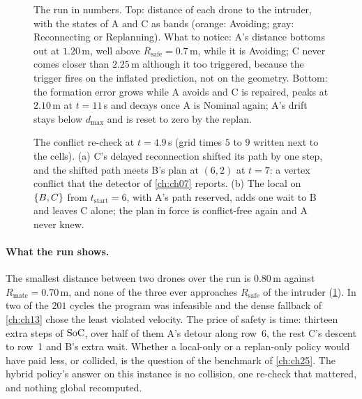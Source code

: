 \begin{figure}[tb]
  \centering
  \caption{The run in numbers. Top: distance of each drone to the intruder,
  with the states of A and C as bands (orange: Avoiding; gray: Reconnecting
  or Replanning). What to notice: A's distance bottoms out at $1.20$\,m,
  well above $R_{\mathrm{safe}} = 0.7$\,m, while it is Avoiding; C never comes
  closer than $2.25$\,m although it too triggered, because the trigger fires
  on the inflated prediction, not on the geometry. Bottom: the formation
  error grows while A avoids and C is repaired, peaks at $2.10$\,m at
  $t = 11$\,s and decays once A is Nominal again; A's drift stays below
  $d_{\max}$ and is reset to zero by the replan.}
  \label{fig:ch24-timeline}
\end{figure}

\begin{figure}[tb]
  \centering
  \caption{The conflict re-check at $t = 4.9$\,s (grid times $5$ to $9$
  written next to the cells). (a) C's delayed reconnection shifted its path
  by one step, and the shifted path meets B's plan at $(6,2)$ at $t = 7$: a
  vertex conflict that the detector of \cref{ch:ch07} reports. (b) The local
  \cbs on $\left\{ B, C \right\}$ from $t_{\mathrm{start}} = 6$, with A's path
  reserved, adds one wait to B and leaves C alone; the plan in force is
  conflict-free again and A never knew.}
  \label{fig:ch24-recheck}
\end{figure}

\paragraph{What the run shows.}
The smallest distance between two drones over the run is $0.80$\,m against
$R_{\mathrm{mate}} = 0.70$\,m, and none of the three ever approaches
$R_{\mathrm{safe}}$ of the intruder (\cref{fig:ch24-timeline}). In two of the
$201$ cycles the \orca program was infeasible and the dense fallback of
\cref{ch:ch13} chose the least violated velocity. The price of safety is
time: thirteen extra steps of $\mathrm{SoC}$, over half of them A's detour along
row~6, the rest C's descent to row~1 and B's extra wait. Whether a
local-only or a replan-only policy would have paid less, or collided, is the
question of the benchmark of \cref{ch:ch25}. The hybrid policy's answer on
this instance is no collision, one re-check that mattered, and nothing
global recomputed.

